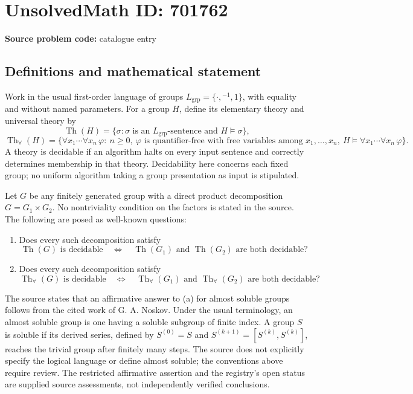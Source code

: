 \documentclass[11pt]{article}
\begin{document}
\section*{UnsolvedMath ID: 701762}
\textbf{Source problem code:} catalogue entry
\subsection{Definitions and mathematical statement}
Work in the usual first-order language of groups \(L_{\mathrm{grp}}=\{\cdot,{}^{-1},1\}\), with equality and without named parameters. For a group \(H\), define its elementary theory and universal theory by
\[
\operatorname{Th}(H)=\{\sigma:\sigma\text{ is an }L_{\mathrm{grp}}\text{-sentence and }H\models\sigma\},
\]
\[
\operatorname{Th}_{\forall}(H)=\{\forall x_1\cdots\forall x_n\,\varphi:\ n\geq 0,\ \varphi\text{ is quantifier-free with free variables among }x_1,\ldots,x_n,\ H\models\forall x_1\cdots\forall x_n\,\varphi\}.
\]
A theory is decidable if an algorithm halts on every input sentence and correctly determines membership in that theory. Decidability here concerns each fixed group; no uniform algorithm taking a group presentation as input is stipulated.

Let \(G\) be any finitely generated group with a direct product decomposition \(G=G_1\times G_2\). No nontriviality condition on the factors is stated in the source. The following are posed as well-known questions:
\begin{enumerate}
\item[(a)] Does every such decomposition satisfy
\[
\operatorname{Th}(G)\text{ is decidable}
\quad\Longleftrightarrow\quad
\operatorname{Th}(G_1)\text{ and }\operatorname{Th}(G_2)\text{ are both decidable}?
\]
\item[(b)] Does every such decomposition satisfy
\[
\operatorname{Th}_{\forall}(G)\text{ is decidable}
\quad\Longleftrightarrow\quad
\operatorname{Th}_{\forall}(G_1)\text{ and }\operatorname{Th}_{\forall}(G_2)\text{ are both decidable}?
\]
\end{enumerate}
The source states that an affirmative answer to (a) for almost soluble groups follows from the cited work of G. A. Noskov. Under the usual terminology, an almost soluble group is one having a soluble subgroup of finite index. A group \(S\) is soluble if its derived series, defined by \(S^{(0)}=S\) and \(S^{(k+1)}=[S^{(k)},S^{(k)}]\), reaches the trivial group after finitely many steps. The source does not explicitly specify the logical language or define almost soluble; the conventions above require review. The restricted affirmative assertion and the registry's open status are supplied source assessments, not independently verified conclusions.
\end{document}
